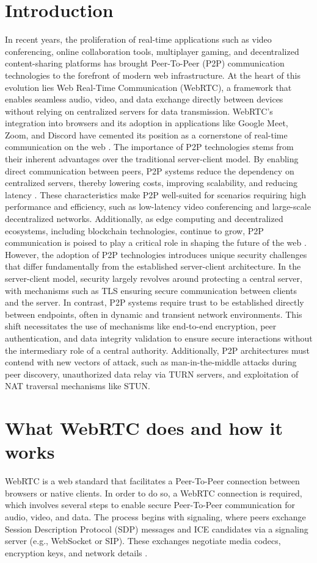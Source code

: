 \documentclass[conference]{IEEEtran}
\begin{document}
\section{Introduction}
In recent years, the proliferation of real-time applications such as video conferencing, online collaboration tools, multiplayer gaming, 
and decentralized content-sharing platforms has brought Peer-To-Peer (P2P) communication technologies to the forefront of modern web 
infrastructure. At the heart of this evolution lies Web Real-Time Communication (WebRTC), a framework that enables seamless audio, video,
and data exchange directly between devices without relying on centralized servers for data transmission. WebRTC's integration into browsers and 
its adoption in applications like Google Meet, Zoom, and Discord have cemented its position as a cornerstone of real-time communication on the web  \cite{Statista_Zoom}.
The importance of P2P technologies stems from their inherent advantages over the traditional server-client model. By enabling direct communication 
between peers, P2P systems reduce the dependency on centralized servers, thereby lowering costs, improving scalability, and reducing latency \cite{systematic_review_of_WebRTC}. 
These characteristics make P2P well-suited for scenarios requiring high performance and efficiency, such as low-latency video conferencing 
and large-scale decentralized networks. Additionally, as edge computing and decentralized ecosystems, including blockchain technologies, continue 
to grow, P2P communication is poised to play a critical role in shaping the future of the web \cite{9297333}. 
However, the adoption of P2P technologies 
introduces unique security challenges that differ fundamentally from the established server-client architecture. In the server-client model,
security largely revolves around protecting a central server, with mechanisms such as TLS ensuring secure communication between clients and
the server. In contrast, P2P systems require trust to be established directly between endpoints, often in dynamic and transient network 
environments. This shift necessitates the use of mechanisms like end-to-end encryption, peer authentication, and data integrity validation to
ensure secure interactions without the intermediary role of a central authority. Additionally, P2P architectures must contend with new vectors
of attack, such as man-in-the-middle attacks during peer discovery, unauthorized data relay via TURN servers, and exploitation of NAT traversal
mechanisms like STUN.

\section{What WebRTC does and how it works}
WebRTC is a web standard that facilitates a Peer-To-Peer connection between browsers or native clients. In order to do so, a WebRTC connection 
is required, which involves several steps to enable secure Peer-To-Peer communication for audio, video, and data. 
The process begins with signaling, where peers exchange Session Description Protocol (SDP) messages and ICE candidates via a 
signaling server (e.g., WebSocket or SIP). These exchanges negotiate media codecs, encryption keys, and network details \cite{W3C_WebRTC}. 
\end{document}
